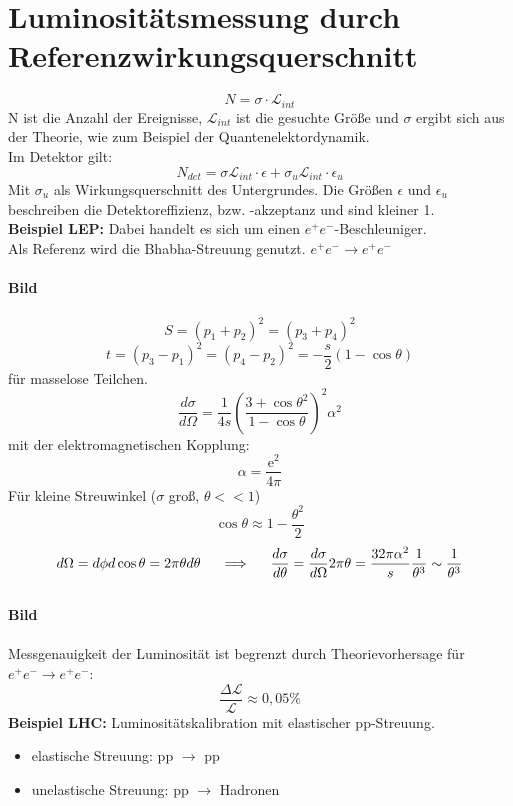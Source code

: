 \section{Luminositätsmessung durch Referenzwirkungsquerschnitt}

\[ N = \sigma \cdot \mathcal{L}_{int}  \]
N ist die Anzahl der Ereignisse, $\mathcal{L}_{int}$ ist die gesuchte Größe und 
$\sigma$ ergibt sich aus der Theorie, wie zum Beispiel der 
Quantenelektordynamik. \\
Im Detektor gilt:
\[ N_{det} = \sigma \mathcal{L}_{int} \cdot \epsilon + \sigma_u 
\mathcal{L}_{int} \cdot \epsilon_u  \]
Mit $\sigma_u$ als Wirkungsquerschnitt des Untergrundes. Die Größen $\epsilon$ 
und $\epsilon_u$ beschreiben die Detektoreffizienz, bzw. -akzeptanz und sind 
kleiner 1. \\
\textbf{Beispiel LEP:} Dabei handelt es sich um einen $e^+ e^-$-Beschleuniger. 
\\
Als Referenz wird die Bhabha-Streuung genutzt. $e^+e^- \longrightarrow e^+e^-$\\
\\
\textbf{Bild}\\
\\
\[ S = (p_1 + p_2)^2 = (p_3 + p_4)^2 \]
\[ t = (p_3 - p_1)^2 = (p_4 - p_2)^2 = - \frac{s}{2} (1 -\cos{\theta}) \]
für masselose Teilchen. 
\[\frac{d\sigma}{d\Omega} = \frac{1}{4s} \left( \frac{3 + \cos{\theta}^2}{1 - 
\cos{\theta}} \right)^2 \alpha^2 \]
mit der elektromagnetischen Kopplung:
\[ \alpha = \frac{\mathrm{e}^2}{4\pi} \]
Für kleine Streuwinkel ($\sigma$ groß, $\theta << 1$) 
\[ \cos{\theta} \approx 1 - \frac{\theta^2}{2} \]
\[ d\Omega = d\phi d \cos{\theta} = 2\pi \theta d\theta \hspace{0.5cm} 
\Longrightarrow \hspace{0.5cm} \frac{d\sigma}{d\theta} = 
\frac{d\sigma}{d\Omega} 2\pi \theta = \frac{32\pi \alpha^2}{s} 
\frac{1}{\theta^3} \sim \frac{1}{\theta^3} \]
\\
\textbf{Bild}\\
\\
Messgenauigkeit der Luminosität ist begrenzt durch Theorievorhersage für 
$e^+e^- \longrightarrow e^+e^-$:
\[ \frac{\Delta \mathcal{L}}{\mathcal{L}} \approx 0,05\% \]
\textbf{Beispiel LHC:} Luminositätskalibration mit elastischer pp-Streuung. \\
\begin{itemize}
	\item[] elastische Streuung: pp $\longrightarrow$ pp
	\item[] unelastische Streuung: pp $\longrightarrow$ Hadronen
\end{itemize}
